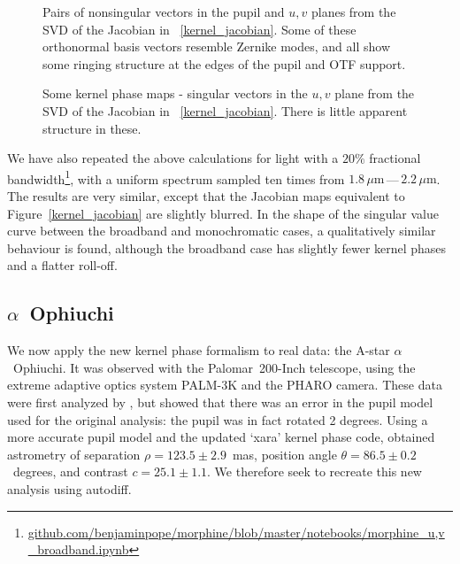 \documentclass[modern]{aastex63}
\begin{document}
\begin{figure}
\caption{Pairs of nonsingular vectors in the pupil and $u,v$ planes from the SVD of the Jacobian in ~\ref{kernel_jacobian}. Some of these orthonormal basis vectors resemble Zernike modes, and all show some ringing structure at the edges of the pupil and OTF support.
\label{nonsingular_modes}}
\end{figure}

\begin{figure}
\caption{Some kernel phase maps - singular vectors in the $u,v$ plane from the SVD of the Jacobian in ~\ref{kernel_jacobian}. There is little apparent structure in these.
\label{kernel_modes}}
\end{figure}

We have also repeated the above calculations for light with a $20\%$ fractional bandwidth\footnote{\href{https://github.com/benjaminpope/morphine/blob/master/notebooks/morphine_u,v_broadband.ipynb}{github.com/benjaminpope/morphine/blob/master/notebooks/morphine\_u,v\_broadband.ipynb}}, with a uniform spectrum sampled ten times from $1.8\,\mu\text{m}$\,---\,$2.2\,\mu\text{m}$. The results are very similar, except that the Jacobian maps equivalent to Figure~\ref{kernel_jacobian} are slightly blurred. In the shape of the singular value curve between the broadband and monochromatic cases, a qualitatively similar behaviour is found, although the broadband case has slightly fewer kernel phases and a flatter roll-off.

\subsection{$\alpha$~Ophiuchi}
\label{sec:palomar}

We now apply the new kernel phase formalism to real data: the A-star $\alpha$~Ophiuchi. It was observed with the Palomar~200-Inch telescope, using the extreme adaptive optics system PALM-3K and the PHARO camera. These data were first analyzed by \citet{palomar}, but \citet{martinache20} showed that there was an error in the pupil model used for the original analysis: the pupil was in fact rotated 2 degrees. Using a more accurate pupil model and the updated `xara' kernel phase code, \citet{martinache20} obtained astrometry of separation $\rho = 123.5 \pm 2.9$~mas, position angle $\theta = 86.5 \pm 0.2$~degrees, and contrast $c = 25.1 \pm 1.1$. We therefore seek to recreate this new analysis using autodiff.
\end{document}
